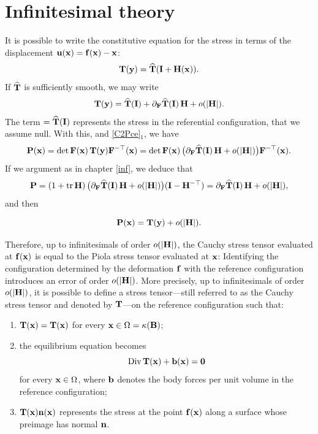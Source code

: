 \section{Infinitesimal theory}
It is possible to write the constitutive equation for the stress in terms of the displacement $\mathbf{u}(\mathbf{x})=\mathbf{f}(\mathbf{x})-\mathbf{x}$:
\begin{equation}
\mathbf{T}(\mathbf{y})=\widehat{\mathbf{T}}(\mathbf{I} +\mathbf{H}(\mathbf{x})).
\end{equation}
If $\widehat{\mathbf{T}}$ is sufficiently smooth, we may write
\begin{equation}
\mathbf{T}(\mathbf{y})=\widehat{\mathbf{T}}(\mathbf{I})+\partial_{\mathbf{F}} \widehat{\mathbf{T}}(\mathbf{I})\,\mathbf{H}+o(|\mathbf{H}|).
\end{equation}
The term $=\widehat{\mathbf{T}}(\mathbf{I})$ represents the stress in the referential configuration, that we assume null. With this, and \eqref{C2Pce}$_1$, we have
\begin{equation}
\mathbf{P}(\mathbf{x})=\det \mathbf{F}(\mathbf{x})\, \mathbf{T}(\mathbf{y}) \mathbf{F}^{-\top}(\mathbf{x})=\det \mathbf{F}(\mathbf{x})\, \big( \partial_{\mathbf{F}} \widehat{\mathbf{T}}(\mathbf{I})\,\mathbf{H}+o(|\mathbf{H}|) \big) \mathbf{F}^{-\top}(\mathbf{x}).
\end{equation}
If we argument as in chapter \ref{inf}, we deduce that
\begin{equation}
\mathbf{P}=(1+\operatorname{tr}\mathbf{H})\,  \big( \partial_{\mathbf{F}} \widehat{\mathbf{T}}(\mathbf{I})\,\mathbf{H}+o(|\mathbf{H}|) \big) (\mathbf{I}-\mathbf{H}^{-\top})=\partial_{\mathbf{F}} \widehat{\mathbf{T}}(\mathbf{I})\,\mathbf{H}+o(|\mathbf{H}|),
\end{equation}
and then
\begin{definition}
\begin{equation}
\mathbf{P}(\mathbf{x})=\mathbf{T}(\mathbf{y})+o(|\mathbf{H}|).
\end{equation}
\end{definition}
Therefore, up to infinitesimals of order \( o(|\mathbf{H}|) \), the Cauchy stress tensor evaluated at \( \mathbf{f}(\mathbf{x}) \) is equal to the Piola stress tensor evaluated at \( \mathbf{x} \):
Identifying the configuration determined by the deformation \( \mathbf{f} \) with the reference configuration introduces an error of order \( o(|\mathbf{H}|) \). More precisely, up to infinitesimals of order \( o(|\mathbf{H}|) \), it is possible to define a stress tensor---still referred to as the Cauchy stress tensor and denoted by \( \mathbf{T} \)---on the reference configuration such that:
\begin{enumerate}
	\item  \( \mathbf{T}(\mathbf{x}) = \mathbf{T}(\mathbf{x}) \) for every \( \mathbf{x} \in \Omega = \kappa(\mathbf{B}) \);
	\item  the equilibrium equation  becomes  
	\[
	\operatorname{Div}\mathbf{T}(\mathbf{x}) + \mathbf{b}(\mathbf{x}) =\mathbf{0}
	\]  
	for every \( \mathbf{x} \in \Omega \), where \( \mathbf{b} \) denotes the body forces per unit volume in the reference configuration;
\item  \( \mathbf{T}(\mathbf{x})\mathbf{n}(\mathbf{x}) \) represents the stress at the point \( \mathbf{f}(\mathbf{x}) \) along a surface whose preimage has normal \( \mathbf{n} \).
\end{enumerate}

